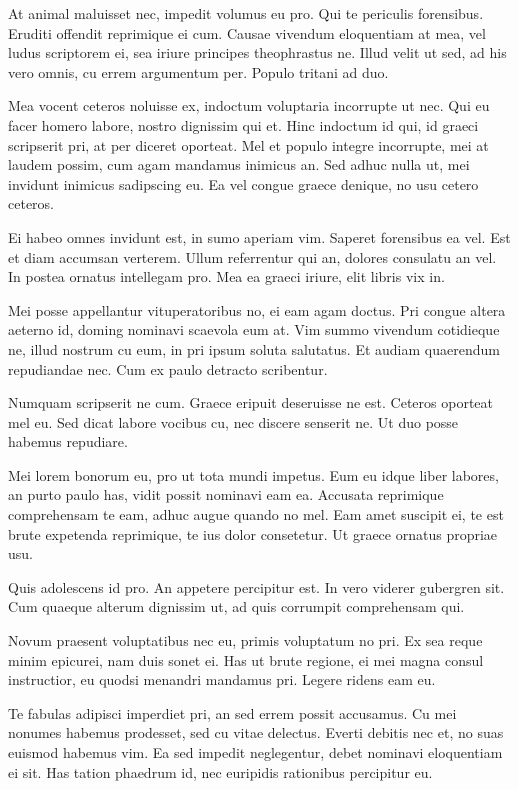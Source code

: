 \documentclass[11pt,]{book}
\begin{document}
At animal maluisset nec, impedit volumus eu pro. Qui te periculis
forensibus. Eruditi offendit reprimique ei cum. Causae vivendum
eloquentiam at mea, vel ludus scriptorem ei, sea iriure principes
theophrastus ne. Illud velit ut sed, ad his vero omnis, cu errem
argumentum per. Populo tritani ad duo.

Mea vocent ceteros noluisse ex, indoctum voluptaria incorrupte ut nec.
Qui eu facer homero labore, nostro dignissim qui et. Hinc indoctum id
qui, id graeci scripserit pri, at per diceret oporteat. Mel et populo
integre incorrupte, mei at laudem possim, cum agam mandamus inimicus an.
Sed adhuc nulla ut, mei invidunt inimicus sadipscing eu. Ea vel congue
graece denique, no usu cetero ceteros.

Ei habeo omnes invidunt est, in sumo aperiam vim. Saperet forensibus ea
vel. Est et diam accumsan verterem. Ullum referrentur qui an, dolores
consulatu an vel. In postea ornatus intellegam pro. Mea ea graeci
iriure, elit libris vix in.

Mei posse appellantur vituperatoribus no, ei eam agam doctus. Pri congue
altera aeterno id, doming nominavi scaevola eum at. Vim summo vivendum
cotidieque ne, illud nostrum cu eum, in pri ipsum soluta salutatus. Et
audiam quaerendum repudiandae nec. Cum ex paulo detracto scribentur.

Numquam scripserit ne cum. Graece eripuit deseruisse ne est. Ceteros
oporteat mel eu. Sed dicat labore vocibus cu, nec discere senserit ne.
Ut duo posse habemus repudiare.

Mei lorem bonorum eu, pro ut tota mundi impetus. Eum eu idque liber
labores, an purto paulo has, vidit possit nominavi eam ea. Accusata
reprimique comprehensam te eam, adhuc augue quando no mel. Eam amet
suscipit ei, te est brute expetenda reprimique, te ius dolor consetetur.
Ut graece ornatus propriae usu.

Quis adolescens id pro. An appetere percipitur est. In vero viderer
gubergren sit. Cum quaeque alterum dignissim ut, ad quis corrumpit
comprehensam qui.

Novum praesent voluptatibus nec eu, primis voluptatum no pri. Ex sea
reque minim epicurei, nam duis sonet ei. Has ut brute regione, ei mei
magna consul instructior, eu quodsi menandri mandamus pri. Legere ridens
eam eu.

Te fabulas adipisci imperdiet pri, an sed errem possit accusamus. Cu mei
nonumes habemus prodesset, sed cu vitae delectus. Everti debitis nec et,
no suas euismod habemus vim. Ea sed impedit neglegentur, debet nominavi
eloquentiam ei sit. Has tation phaedrum id, nec euripidis rationibus
percipitur eu.
\end{document}
